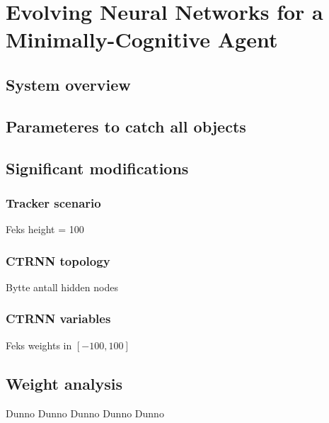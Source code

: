 \section{Evolving Neural Networks for a Minimally-Cognitive Agent}
\subsection{System overview}

\subsection{Parameteres to catch all objects}


\subsection{Significant modifications}
\subsubsection{Tracker scenario}
Feks height = 100

\subsubsection{CTRNN topology}
Bytte antall hidden nodes

\subsubsection{CTRNN variables}
Feks weights in $[-100, 100]$

\subsection{Weight analysis}
Dunno Dunno Dunno Dunno Dunno 
